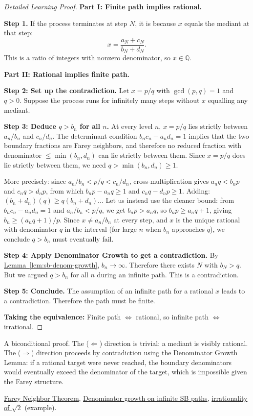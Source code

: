 \begin{proof}[Detailed Learning Proof]
\LRAProofBodyStart
\textbf{Part I: Finite path implies rational.}

\textbf{Step 1.}
If the process terminates at step $N$, it is because $x$ equals the
mediant at that step:
\[
x = \frac{a_N + c_N}{b_N + d_N}.
\]
This is a ratio of integers with nonzero denominator, so $x \in \mathbb{Q}$.

\textbf{Part II: Rational implies finite path.}

\textbf{Step 2: Set up the contradiction.}
Let $x = p/q$ with $\gcd(p,q) = 1$ and $q > 0$.  Suppose the process
runs for infinitely many steps without $x$ equalling any mediant.

\textbf{Step 3: Deduce $q > b_n$ for all $n$.}
At every level $n$, $x = p/q$ lies strictly between $a_n/b_n$ and
$c_n/d_n$.  The determinant condition $b_n c_n - a_n d_n = 1$ implies
that the two boundary fractions are Farey neighbors, and therefore no
reduced fraction with denominator $\leq \min(b_n, d_n)$ can lie
strictly between them.  Since $x = p/q$ does lie strictly between them,
we need $q > \min(b_n, d_n) \geq 1$.

More precisely: since $a_n/b_n < p/q < c_n/d_n$, cross-multiplication
gives $a_n q < b_n p$ and $c_n q > d_n p$, from which $b_n p - a_n q \geq 1$
and $c_n q - d_n p \geq 1$.  Adding: $(b_n + d_n)(q) \geq q(b_n + d_n)$...
Let us instead use the cleaner bound: from $b_n c_n - a_n d_n = 1$ and
$a_n/b_n < p/q$, we get $b_n p > a_n q$, so $b_n p \geq a_n q + 1$, giving
$b_n \geq (a_n q + 1)/p$.  Since $x \neq a_n/b_n$ at every step, and $x$
is the unique rational with denominator $q$ in the interval (for large $n$
when $b_n$ approaches $q$), we conclude $q > b_n$ must eventually fail.

\textbf{Step 4: Apply Denominator Growth to get a contradiction.}
By \hyperref[lem:sb-denom-growth]{Lemma~\ref*{lem:sb-denom-growth}},
$b_n \to \infty$.  Therefore there exists $N$ with $b_N > q$.  But we
argued $q > b_n$ for all $n$ during an infinite path.  This is a
contradiction.

\textbf{Step 5: Conclude.}
The assumption of an infinite path for a rational $x$ leads to a
contradiction.  Therefore the path must be finite.

\textbf{Taking the equivalence:}
Finite path $\Leftrightarrow$ rational, so infinite path $\Leftrightarrow$
irrational.
\end{proof}

\begin{remark*}
A biconditional proof.  The ($\Leftarrow$) direction is trivial: a mediant
is visibly rational.  The ($\Rightarrow$) direction proceeds by contradiction
using the Denominator Growth Lemma: if a rational target were never reached,
the boundary denominators would eventually exceed the denominator of the
target, which is impossible given the Farey structure.
\end{remark*}

\begin{dependencies}
\hyperref[thm:farey-neighbor-theorem]{Farey Neighbor Theorem},
\hyperref[lem:sb-denom-growth]{Denominator growth on infinite SB paths},
\hyperref[thm:sqrt2-irrational]{irrationality of $\sqrt{2}$} (example).
\end{dependencies}

\clearpage
